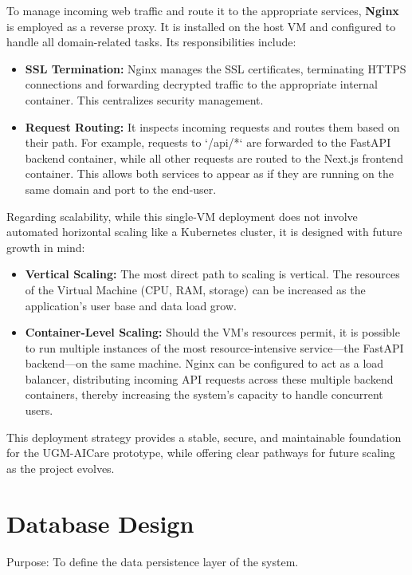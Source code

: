 To manage incoming web traffic and route it to the appropriate services, \textbf{Nginx} is employed as a reverse proxy. It is installed on the host VM and configured to handle all domain-related tasks. Its responsibilities include:
\begin{itemize}
    \item \textbf{SSL Termination:} Nginx manages the SSL certificates, terminating HTTPS connections and forwarding decrypted traffic to the appropriate internal container. This centralizes security management.
    \item \textbf{Request Routing:} It inspects incoming requests and routes them based on their path. For example, requests to `/api/*` are forwarded to the FastAPI backend container, while all other requests are routed to the Next.js frontend container. This allows both services to appear as if they are running on the same domain and port to the end-user.
\end{itemize}

Regarding scalability, while this single-VM deployment does not involve automated horizontal scaling like a Kubernetes cluster, it is designed with future growth in mind:
\begin{itemize}
    \item \textbf{Vertical Scaling:} The most direct path to scaling is vertical. The resources of the Virtual Machine (CPU, RAM, storage) can be increased as the application's user base and data load grow.
    \item \textbf{Container-Level Scaling:} Should the VM's resources permit, it is possible to run multiple instances of the most resource-intensive service—the FastAPI backend—on the same machine. Nginx can be configured to act as a load balancer, distributing incoming API requests across these multiple backend containers, thereby increasing the system's capacity to handle concurrent users.
\end{itemize}

This deployment strategy provides a stable, secure, and maintainable foundation for the UGM-AICare prototype, while offering clear pathways for future scaling as the project evolves.


\section{Database Design}
Purpose: To define the data persistence layer of the system.


